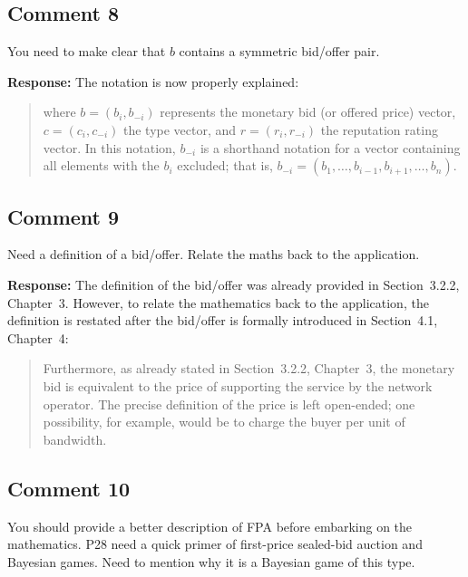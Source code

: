 \documentclass[10pt,a4paper,notitlepage]{article}
\numberwithin{equation}{section}
\begin{document}
\subsection{Comment 8}
You need to make clear that $b$ contains a symmetric bid/offer pair.

\textbf{Response:}
The notation is now properly explained:
\begin{quote}
where $b = (b_i,b_{-i})$ represents the monetary bid (or offered price) vector, $c = (c_i, c_{-i})$ the type vector, and $r = (r_i, r_{-i})$ the reputation rating vector. In this notation, $b_{-i}$ is a shorthand notation for a vector containing all elements with the $b_i$ excluded; that is, $b_{-i} = (b_1, \ldots, b_{i-1}, b_{i+1}, \ldots, b_n)$.
\end{quote}

\subsection{Comment 9}
Need a definition of a bid/offer. Relate the maths back to the application.

\textbf{Response:}
The definition of the bid/offer was already provided in Section~3.2.2, Chapter~3. However, to relate the mathematics back to the application, the definition is restated after the bid/offer is formally introduced in Section~4.1, Chapter~4:
\begin{quote}
Furthermore, as already stated in Section~3.2.2, Chapter~3, the monetary bid is equivalent to the price of supporting the service by the network operator. The precise definition of the price is left open-ended; one possibility, for example, would be to charge the buyer per unit of bandwidth.
\end{quote}

\subsection{Comment 10}
You should provide a better description of FPA before embarking on the mathematics. P28 need a quick primer of first-price sealed-bid auction and Bayesian games. Need to mention why it is a Bayesian game of this type.
\end{document}
